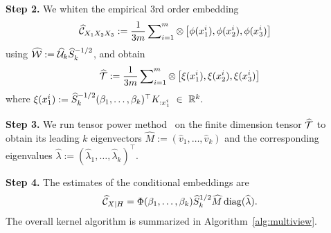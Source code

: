 \documentclass{article}
\begin{document}
{\bf Step 2.} We whiten the empirical 3rd order embedding
\begin{align*}
  &\widehat {\mathcal{C}}_{X_1 X_2 X_3}:= \frac{1}{3m}\sum\nolimits_{i=1}^{m} \otimes \left[\phi(x_1^i), \phi(x_2^i), \phi(x_3^i)\right]
\end{align*}
using $\widehat {\mathcal{W}}:= \widehat {\mathcal{U}}_k \widehat S_k^{-1/2}$, and obtain
\begin{align*}
  \widehat {{\mathcal{T}}} := \frac{1}{3m}\sum\nolimits_{i=1}^m \otimes\left[\xi(x_1^i), \xi(x_2^i), \xi(x_3^i)\right]
\end{align*}
where
$
	\xi(x_1^i) := \widehat S_k^{-1/2} (\beta_1,\ldots,\beta_k)^\top K_{:x_1^i}~ \in~\mathbb{R}^k.
$

{\bf Step 3.} We run tensor power method~\cite{AnandkumarEtal:tensor12} on the finite dimension tensor $\widehat {{\mathcal{T}}}$ to obtain its leading $k$ eigenvectors $\widehat M:=(\widehat v_1,\ldots,\widehat v_k)$ and the corresponding eigenvalues $\widehat \lambda := (\widehat\lambda_1,\ldots,\widehat\lambda_k)^\top$.

{\bf Step 4.} The estimates of the conditional embeddings are
\begin{align*}
  \widehat {\mathcal{C}}_{X|H} = \Phi (\beta_1,\ldots,\beta_k) \widehat  S_k^{1/2} \widehat M \mathop{\mathrm{diag}}(\widehat \lambda).
\end{align*}
The overall kernel algorithm is summarized in Algorithm~\ref{alg:multiview}.
\end{document}
